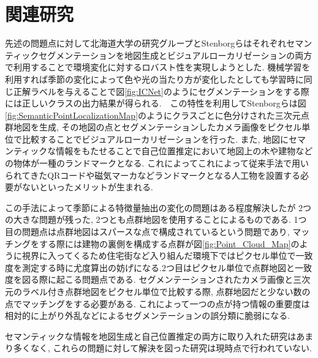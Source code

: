  \section{関連研究}\label{sec:related_work}
 先述の問題点に対して北海道大学の研究グループ\cite{semantic_segmentation_in_snow}とStenborgら\cite{semantic_point_localization}\cite{Toft_2018_ECCV}\cite{SattlerMTSPPO17}はそれぞれセマンティックセグメンテーションを地図生成とビジュアルローカリゼーションの両方で利用することで環境変化に対するロバスト性を実現しようとした. 機械学習を利用すれば季節の変化によって色や光の当たり方が変化したとしても学習時に同じ正解ラベルを与えることで図\ref{fig:ICNet}のようにセグメンテーションをする際には正しいクラスの出力結果が得られる.　この特性を利用してStenborgらは図\ref{fig:SemanticPointLocalizationMap}のようにクラスごとに色分けされた三次元点群地図を生成, その地図の点とセグメンテーションしたカメラ画像をピクセル単位で比較することでビジュアルローカリゼーションを行った\cite{semantic_point_localization}. また, 地図にセマンティックな情報をもたせることで自己位置推定において地図上の木や建物などの物体が一種のランドマークとなる. これによってこれによって従来手法で用いられてきたQRコード\cite{QR_code_localization}や磁気マーカ\cite{jiki_marker_localization}などランドマークとなる人工物を設置する必要がないといったメリットが生まれる. \par この手法によって季節による特徴量抽出の変化の問題はある程度解決したが
2つの大きな問題が残った, 2つとも点群地図を使用することによるものである. 1つ目の問題点は点群地図はスパースな点で構成されているという問題であり, マッチングをする際には建物の裏側を構成する点群が図\ref{fig:Point_Cloud_Map}のように視界に入ってくるため住宅街など入り組んだ環境下ではピクセル単位で一致度を測定する時に尤度算出の妨げになる.2つ目はピクセル単位で点群地図と一致度を図る際に起こる問題点である. セグメンテーションされたカメラ画像と三次元のラベル付き点群地図をピクセル単位で比較する際, 点群地図だと少ない数の点でマッチングをする必要がある. これによって一つの点が持つ情報の重要度は相対的に上がり外乱などによるセグメンテーションの誤分類に脆弱になる. \par セマンティックな情報を地図生成と自己位置推定の両方に取り入れた研究はあまり多くなく, これらの問題に対して解決を図った研究は現時点で行われていない.
 
